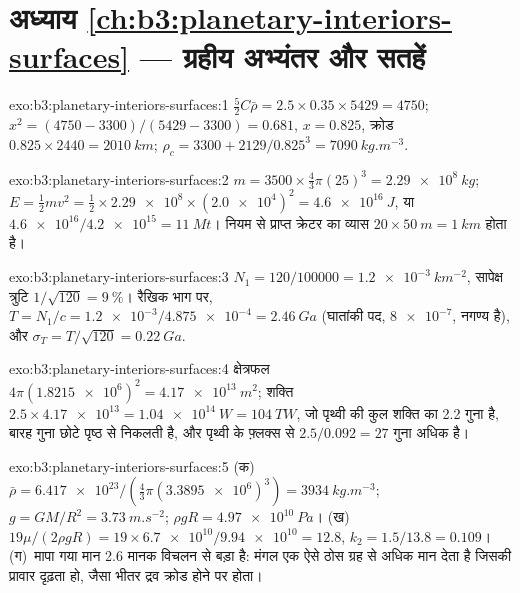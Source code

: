 \section*{अध्याय \ref{ch:b3:planetary-interiors-surfaces} --- ग्रहीय अभ्यंतर और सतहें}

\begin{solution}{exo:b3:planetary-interiors-surfaces:1}
$\tfrac52C\bar\rho = 2.5\times0.35\times5429 = 4750$; $x^2 = (4750 -
3300)/(5429 - 3300) = 0.681$, $x = 0.825$, क्रोड $0.825\times2440 =
\qty{2010}{km}$; $\rho_c = 3300 + 2129/0.825^3 = \qty{7090}{kg.m^{-3}}$.
\end{solution}

\begin{solution}{exo:b3:planetary-interiors-surfaces:2}
$m = 3500\times\tfrac43\pi(25)^3 = \qty{2.29e8}{kg}$; $E = \tfrac12 m v^2 =
\tfrac12\times\num{2.29e8}\times(\num{2.0e4})^2 = \qty{4.6e16}{J}$, या
$\num{4.6e16}/\num{4.2e15} = \qty{11}{Mt}$। नियम से प्राप्त क्रेटर का व्यास
$20\times\qty{50}{m} = \qty{1}{km}$ होता है।
\end{solution}

\begin{solution}{exo:b3:planetary-interiors-surfaces:3}
$N_1 = 120/\num{100000} = \qty{1.2e-3}{km^{-2}}$, सापेक्ष त्रुटि $1/\sqrt{120}
= \qty{9}{\percent}$। रैखिक भाग पर, $T = N_1/c = \num{1.2e-3}/\num{4.875e-4}
= \qty{2.46}{Ga}$ (घातांकी पद, $\num{8e-7}$, नगण्य है), और
$\sigma_T = T/\sqrt{120} = \qty{0.22}{Ga}$.
\end{solution}

\begin{solution}{exo:b3:planetary-interiors-surfaces:4}
क्षेत्रफल $4\pi(\num{1.8215e6})^2 = \qty{4.17e13}{m^2}$; शक्ति $2.5\times
\num{4.17e13} = \qty{1.04e14}{W} = \qty{104}{TW}$, जो पृथ्वी की कुल शक्ति का 2.2 गुना है,
बारह गुना छोटे पृष्ठ से निकलती है, और पृथ्वी के फ़्लक्स से $2.5/0.092 = 27$ गुना
अधिक है।
\end{solution}

\begin{solution}{exo:b3:planetary-interiors-surfaces:5}
(क)~$\bar\rho = \num{6.417e23}/(\tfrac43\pi(\num{3.3895e6})^3) =
\qty{3934}{kg.m^{-3}}$; $g = GM/R^2 = \qty{3.73}{m.s^{-2}}$; $\rho gR =
\qty{4.97e10}{Pa}$। (ख)~$19\mu/(2\rho gR) = 19\times\num{6.7e10}/\num{9.94e10}
= 12.8$, $k_2 = 1.5/13.8 = 0.109$। (ग)~मापा गया मान
2.6 मानक विचलन से बड़ा है: मंगल एक ऐसे ठोस ग्रह से अधिक मान देता है जिसकी प्रावार दृढ़ता हो,
जैसा भीतर द्रव क्रोड होने पर होता।
\end{solution}

